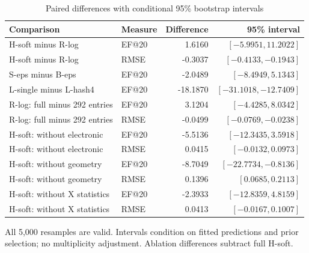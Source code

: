 \par
\begin{table}[H]
\centering
\begin{threeparttable}
\caption{Paired differences with conditional 95\% bootstrap intervals}\label{tab:paired}
\begin{tabularx}{\linewidth}{@{}X l r r@{}}
\toprule
Comparison & Measure & Difference & 95\% interval\\
\midrule
H-soft minus R-log & EF@20 & 1.6160 & $[-5.9951, 11.2022]$\\
H-soft minus R-log & RMSE & -0.3037 & $[-0.4133, -0.1943]$\\
S-eps minus B-eps & EF@20 & -2.0489 & $[-8.4949, 5.1343]$\\
L-single minus L-hash4 & EF@20 & -18.1870 & $[-31.1018, -12.7409]$\\
R-log: full minus 292 entries & EF@20 & 3.1204 & $[-4.4285, 8.0342]$\\
R-log: full minus 292 entries & RMSE & -0.0499 & $[-0.0769, -0.0238]$\\
H-soft: without electronic & EF@20 & -5.5136 & $[-12.3435, 3.5918]$\\
H-soft: without electronic & RMSE & 0.0415 & $[-0.0132, 0.0973]$\\
H-soft: without geometry & EF@20 & -8.7049 & $[-22.7734, -0.8136]$\\
H-soft: without geometry & RMSE & 0.1396 & $[0.0685, 0.2113]$\\
H-soft: without X statistics & EF@20 & -2.3933 & $[-12.8359, 4.8159]$\\
H-soft: without X statistics & RMSE & 0.0413 & $[-0.0167, 0.1007]$\\
\bottomrule
\end{tabularx}
\begin{tablenotes}[flushleft]
\item[] All 5,000 resamples are valid. Intervals condition on fitted predictions and prior selection; no multiplicity adjustment. Ablation differences subtract full H-soft.
\end{tablenotes}
\end{threeparttable}
\end{table}
\par
